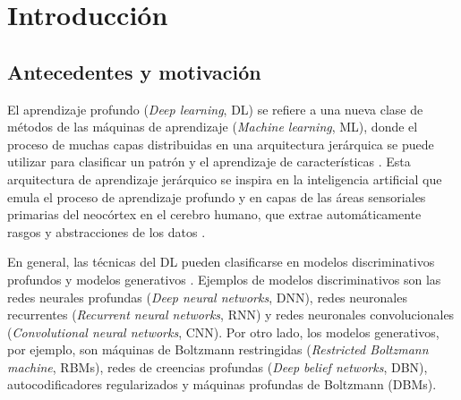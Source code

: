 \chapter{Introducción}
\section{Antecedentes y motivación}
El aprendizaje profundo ({\em Deep learning}, DL) se refiere a una nueva clase de métodos de las máquinas de aprendizaje ({\em Machine learning}, ML), donde el proceso de muchas capas distribuidas en una arquitectura jerárquica se puede utilizar para clasificar un patrón y el aprendizaje de características \cite{Hinton2006, Bengio2009}. Esta arquitectura de aprendizaje jerárquico se inspira en la inteligencia artificial que emula el proceso de aprendizaje profundo y en capas de las áreas sensoriales primarias del neocórtex en el cerebro humano, que extrae automáticamente rasgos y abstracciones de los datos \cite{Bengio2007, Bengio2013, Arel2010}. %

En general, las técnicas del DL pueden clasificarse en modelos discriminativos profundos y modelos generativos \cite{Deng2014}. Ejemplos de modelos discriminativos son las redes neurales profundas ({\em Deep neural networks}, DNN), redes neuronales recurrentes ({\em Recurrent neural networks}, RNN) y redes neuronales convolucionales ({\em Convolutional neural networks}, CNN). Por otro lado, los modelos generativos, por ejemplo, son máquinas de Boltzmann restringidas ({\em Restricted Boltzmann machine}, RBMs), redes de creencias profundas ({\em Deep belief networks}, DBN), autocodificadores regularizados y máquinas profundas de Boltzmann (DBMs).

